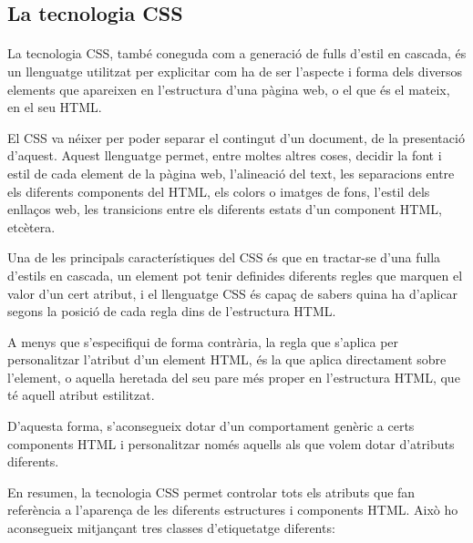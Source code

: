 \subsection{La tecnologia CSS}

    \paragraph{}
    La tecnologia CSS, també coneguda com a generació de fulls d'estil en cascada, és un llenguatge utilitzat per explicitar com ha de ser l'aspecte i forma dels diversos elements que apareixen en l’estructura d’una pàgina web, o el que és el mateix, en el seu HTML.

    El CSS va néixer per poder separar el contingut d'un document, de la presentació d'aquest. Aquest llenguatge permet, entre moltes altres coses, decidir la font i estil de cada element de la pàgina web, l'alineació del text, les separacions entre els diferents components del HTML, els colors o imatges de fons, l'estil dels enllaços web, les transicions entre els diferents estats d’un component HTML, etcètera.

    Una de les principals característiques del CSS és que en tractar-se d'una fulla d'estils en cascada, un element pot tenir definides diferents regles que marquen el valor d’un cert atribut, i el llenguatge CSS és capaç de sabers quina ha d’aplicar segons la posició de cada regla dins de l'estructura HTML.

    A menys que s’especifiqui de forma contrària, la regla que s’aplica per personalitzar l'atribut d'un element HTML, és la que aplica directament sobre l’element, o aquella heretada del seu pare més proper en l’estructura HTML, que té aquell atribut estilitzat.

    D'aquesta forma, s'aconsegueix dotar d'un comportament genèric a certs components HTML i personalitzar només aquells als que volem dotar d'atributs diferents.

    En resumen, la tecnologia CSS permet controlar tots els atributs que fan referència a l'aparença de les diferents estructures i components HTML. Això ho aconsegueix mitjançant tres classes d'etiquetatge diferents:

